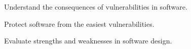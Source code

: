 \item Understand the consequences of vulnerabilities in software.
\item Protect software from the easiest vulnerabilities.
\item Evaluate strengths and weaknesses in software design.
